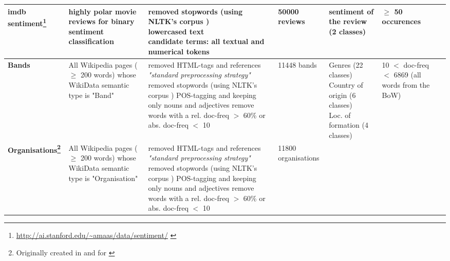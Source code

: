{\begin{landscape}
\begin{table}[]
{\begin{tabular}{@{}lllllll@{}}
				\textbf{imdb sentiment\footnote{\url{http://ai.stanford.edu/~amaas/data/sentiment/} \cite{maas-EtAl:2011:ACL-HLT2011}} \cite{Ager2018}} &
					highly polar movie reviews for binary sentiment classification  &
					\specialcell[l]{ \tabitem removed stopwords (using NLTK's corpus \cite{loper-bird-2002-nltk})\\ \tabitem lowercased text\\ \tabitem candidate terms: all textual and numerical tokens} &
					50000 reviews &
					\tabitem sentiment of the review (2 classes) &
					$\geq$ 50 occurences
					\\ \midrule
				\textbf{Bands \cite{Alshaikh2020}} &
					\specialcell[l]{All Wikipedia pages ($\geq$ 200 words) whose \\ WikiData semantic type is "Band"} &
					\specialcell[l]{ \tabitem removed HTML-tags and references \\ \tabitem \textit{"standard preprocessing strategy"} \cite[137]{Alshaikh2019} \\ \tabitem removed stopwords (using NLTK's corpus \cite{loper-bird-2002-nltk})\\ \tabitem POS-tagging and keeping only nouns and adjectives \\ \tabitem remove words with a rel. doc-freq  $>$ 60\% or abs. doc-freq $<$ 10 } &
					11448 bands & \specialcell[l]{ \tabitem Genres (22 classes) \\ \tabitem Country of origin (6 classes) \\ \tabitem Loc. of formation (4 classes) }  & 
					\specialcell[l]{ 10 $<$ doc-freq $<$ 6869 \\ (all words from the BoW)}\\ \midrule
				\textbf{Organisations\footnote{\label{fnote:for_alshaikh2019} Originally created in and for \cite{Alshaikh2019}} \cite{Alshaikh2020}} &
					\specialcell[l]{All Wikipedia pages ($\geq$ 200 words) whose \\ WikiData semantic type is "Organisation"} &
					\specialcell[l]{ \tabitem removed HTML-tags and references \\ \tabitem \textit{"standard preprocessing strategy"} \cite[137]{Alshaikh2019} \\ \tabitem removed stopwords (using NLTK's corpus \cite{loper-bird-2002-nltk})\\ \tabitem POS-tagging and keeping only nouns and adjectives \\ \tabitem remove words with a rel. doc-freq  $>$ 60\% or abs. doc-freq $<$ 10 } &
					11800 organisations &

\end{tabular}}
\end{table}
\end{landscape}}
